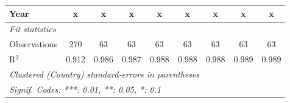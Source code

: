 \begin{table}[htbp]
\begin{tabular}{lcccccccc}
      Year                                                    & x             & x       & x       & x            & x            & x            & x            & x\\  
      \midrule \emph{Fit statistics}\\
      Observations                                            & 270           & 63      & 63      & 63           & 63           & 63           & 63           & 63\\  
      R$^2$                                                   & 0.912         & 0.986   & 0.987   & 0.988        & 0.988        & 0.988        & 0.989        & 0.989\\  
      \midrule
      \multicolumn{9}{l}{\emph{Clustered (Country) standard-errors in parentheses}}\\
      \multicolumn{9}{l}{\emph{Signif. Codes: ***: 0.01, **: 0.05, *: 0.1}}\\
   \end{tabular}
\end{table}


